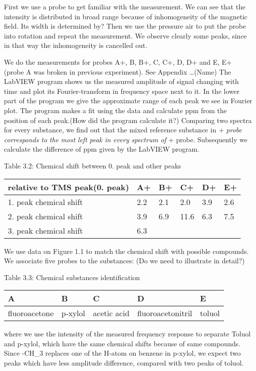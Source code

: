First we use a probe to get familiar with the measurement. We can see
that the intensity is distributed in broad range because of
inhomogeneity of the magnetic field. Its width is determined by? Then we
use the pressure air to put the probe into rotation and repeat the
measurement. We observe clearly some peaks, since in that way the
inhomogeneity is cancelled out.

We do the measurements for probes A+, B, B+, C, C+, D, D+ and E, E+
(probe A was broken in previous experiment). See Appendix \ldots{}(Name)
The LabVIEW program shows us the measured amplitude of signal changing
with time and plot its Fourier-transform in frequency space next to it.
In the lower part of the program we give the approximate range of each
peak we see in Fourier plot. The program makes a fit using the data and
calculate ppm from the position of each peak.(How did the program
calculate it?) Comparing two spectra for every substance, we find out
that the mixed reference substance in \emph{+ probe corresponds to the
most left peak in every spectrum of }+ probe. Subsequently we calculate
the difference of ppm given by the LabVIEW program.

Table 3.2: Chemical shift between 0. peak and other peaks

\begin{longtable}[]{@{}llllll@{}}
\toprule
relative to TMS peak(0. peak) & A+ & B+ & C+ & D+ & E+\tabularnewline
\midrule
\endhead
1. peak chemical shift & 2.2 & 2.1 & 2.0 & 3.9 & 2.6\tabularnewline
2. peak chemical shift & 3.9 & 6.9 & 11.6 & 6.3 & 7.5\tabularnewline
3. peak chemical shift & 6.3 & & & &\tabularnewline
\bottomrule
\end{longtable}

We use data on Figure 1.1 to match the chemical shift with possible
compounds. We associate five probes to the substances: (Do we need to
illustrate in detail?)

Table 3.3: Chemical substances identification

\begin{longtable}[]{@{}lllll@{}}
\toprule
A & B & C & D & E\tabularnewline
\midrule
\endhead
fluoroacetone & p-xylol & acetic acid & fluoroacetonitril &
toluol\tabularnewline
\bottomrule
\end{longtable}

where we use the intensity of the measured frequency response to
separate Toluol and p-xylol, which have the same chemical shifts because
of same compounds. Since -CH\_3 replaces one of the H-atom on benzene in
p-xylol, we expect two peaks which have less amplitude difference,
compared with two peaks of toluol.

